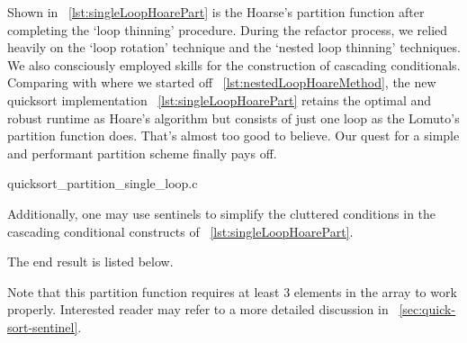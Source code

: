 Shown in ~\autoref{lst:singleLoopHoarePart} is the Hoarse's partition function
after completing the `loop thinning' procedure.
During the refactor process, we relied heavily on the `loop rotation' technique and
the `nested loop thinning' techniques.
We also consciously employed skills for the construction of cascading conditionals.
Comparing with where we started off ~\autoref{lst:nestedLoopHoareMethod},
the new quicksort implementation ~\autoref{lst:singleLoopHoarePart}
retains the optimal and robust runtime as Hoare's algorithm but consists of just one loop as the
Lomuto's partition function does.
That's almost too good to believe.
Our quest for a simple and performant partition scheme finally pays off.


\newpage

{quicksort_partition_single_loop.c}


Additionally, one may use
sentinels to simplify the cluttered conditions in the cascading conditional constructs of
~\autoref{lst:singleLoopHoarePart}.

The end result is listed below.

Note that this partition function requires at least $3$ elements in the array to work properly.
Interested reader may refer to a more detailed discussion in ~\autoref{sec:quick-sort-sentinel}.
